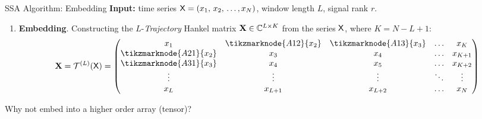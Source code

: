 \documentclass[pdf, unicode, ucs, notheorems]{beamer}
\newcommand{\bluetext}[1]{{\usebeamercolor[fg]{bluetext_color}#1}}
\theoremstyle{definition}
\begin{document}



\begin{frame}{SSA Algorithm: Embedding}
  \textbf{Input:} time series $\mathsf{X} = (x_1,\, x_2,\, \ldots, x_N)$,
  window length $L$, signal rank $r$.
  \vspace{0.4cm}\\
  \begin{enumerate}
    \item \textbf{Embedding}.
      Constructing the $L$-\emph{Trajectory} Hankel matrix $\mathbf{X}\in
      \mathbb{C}^{L \times K}$ from the series $\mathsf{X}$, where $K = N - L + 1$:\\
      \[
        \bfX = \calT^{(L)}(\tX) =
        \begin{pmatrix}
          x_1                     & \tikzmarknode{A12}{x_2} &
          \tikzmarknode{A13}{x_3} & \ldots & x_K     \\
          \tikzmarknode{A21}{x_2} & x_3                     & x_4
          & \ldots & x_{K+1} \\
          \tikzmarknode{A31}{x_3} & x_4                     & x_5
          & \ldots & x_{K+2} \\
          \vdots                  & \vdots                  & \vdots
          & \ddots & \vdots  \\
          x_L                     & x_{L+1}                 & x_{L+2}
          & \ldots & x_N
        \end{pmatrix}
      \]
  \end{enumerate}

  \bigskip

  \bluetext{Why not embed into a higher order array (tensor)?}
\end{frame}
\end{document}
